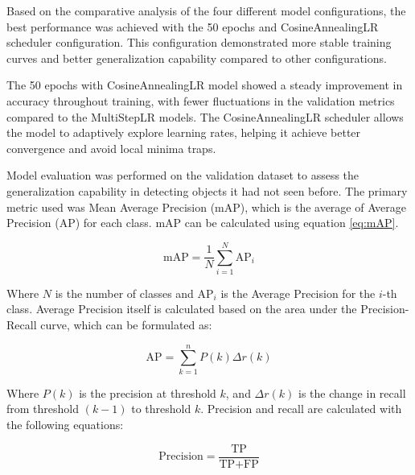 Based on the comparative analysis of the four different model configurations, the best performance was achieved with the 50 epochs and CosineAnnealingLR scheduler configuration. This configuration demonstrated more stable training curves and better generalization capability compared to other configurations.

The 50 epochs with CosineAnnealingLR model showed a steady improvement in accuracy throughout training, with fewer fluctuations in the validation metrics compared to the MultiStepLR models. The CosineAnnealingLR scheduler allows the model to adaptively explore learning rates, helping it achieve better convergence and avoid local minima traps.


Model evaluation was performed on the validation dataset to assess the generalization capability in detecting objects it had not seen before. The primary metric used was Mean Average Precision (mAP), which is the average of Average Precision (AP) for each class. mAP can be calculated using equation \ref{eq:mAP}.

\begin{equation}
\mbox{mAP} = \frac{1}{N} \sum_{i=1}^{N} \mbox{AP}_i
\label{eq:mAP}
\end{equation}

Where $N$ is the number of classes and $\mbox{AP}_i$ is the Average Precision for the $i$-th class. Average Precision itself is calculated based on the area under the Precision-Recall curve, which can be formulated as:

\begin{equation}
\mbox{AP} = \sum_{k=1}^{n} P(k) \Delta r(k)
\label{eq:AP}
\end{equation}

Where $P(k)$ is the precision at threshold $k$, and $\Delta r(k)$ is the change in recall from threshold $(k-1)$ to threshold $k$. Precision and recall are calculated with the following equations:

\begin{equation}
\mbox{Precision} = \frac{\mbox{TP}}{\mbox{TP} + \mbox{FP}}
\label{eq:precision}
\end{equation}

